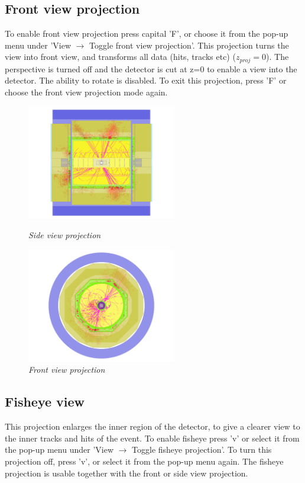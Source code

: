 \documentclass[a4paper,10pt]{article}
\begin{document}
\subsection{Front view projection}
To enable front view projection press capital 'F', or choose it from the pop-up menu under 'View $\rightarrow$ Toggle front view projection'. This projection turns the view into front view, and transforms all data (hits, tracks etc)
($z_{proj} = 0$). The perspective is turned off and the detector is cut at z=0 to enable a view into the detector. The ability to rotate is disabled. To exit this projection, press 'F' or choose the front view projection mode again. 

\begin{figure}[h!]
\begin{minipage}[t]{6cm}
\centerline{\includegraphics[height=5cm]{sideview2.png}}
\caption{\label{CEDViewer} \textsl{Side view projection}}
\end{minipage}
\hfill
\begin{minipage}[t]{6cm}
\setlength{\fboxsep}{0mm}
\centerline{\includegraphics[height=5cm]{frontview2.png}}
\caption{\label{DSTViewer}\textsl{Front view projection}}
\end{minipage}
\end{figure}

\subsection{Fisheye view}
This projection enlarges the inner region of the detector, to give a clearer view to the inner tracks and hits of the event. To enable fisheye press 'v' or select it from the pop-up menu under 'View $\rightarrow$ Toggle fisheye projection'. To turn this projection off, press 'v', or select it from the pop-up menu again. The fisheye projection is usable together with the front or side view projection.
\end{document}
